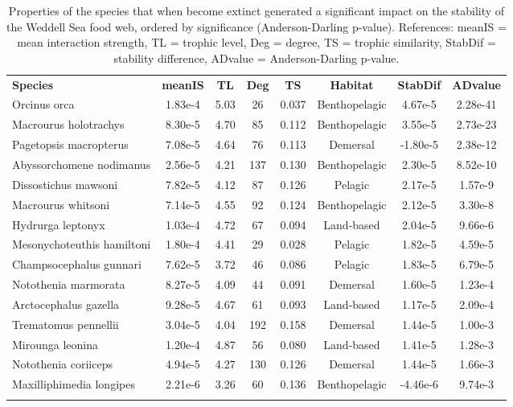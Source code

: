 \documentclass[gc, manuscript]{copernicus}
\begin{document}
\clearpage

\begin{table}[t]
\caption{Properties of the species that when become extinct generated a significant impact on the stability of the Weddell Sea food web, ordered by significance (Anderson-Darling p-value). References: meanIS = mean interaction strength, TL = trophic level, Deg = degree, TS = trophic similarity, StabDif = stability difference, ADvalue = Anderson-Darling p-value.}
\begin{tabular}{l c c c c c c c}
\tophline

\textbf{Species} & \textbf{meanIS} & \textbf{TL} & \textbf{Deg} & \textbf{TS} & \textbf{Habitat} & \textbf{StabDif} & \textbf{ADvalue}\\
\middlehline
Orcinus orca & 1.83e-4 & 5.03 & 26 & 0.037 & Benthopelagic & 4.67e-5 & 2.28e-41 \\
\middlehline
Macrourus holotrachys & 8.30e-5 & 4.70 & 85 & 0.112 & Benthopelagic & 3.55e-5 & 2.73e-23 \\
\middlehline
Pagetopsis macropterus & 7.08e-5 & 4.64 & 76 & 0.113 & Demersal & -1.80e-5 & 2.38e-12 \\
\middlehline
Abyssorchomene nodimanus & 2.56e-5 & 4.21 & 137 & 0.130 & Benthopelagic & 2.30e-5 & 8.52e-10 \\
\middlehline
Dissostichus mawsoni & 7.82e-5 & 4.12 & 87 & 0.126 & Pelagic & 2.17e-5 & 1.57e-9 \\
\middlehline
Macrourus whitsoni & 7.14e-5 & 4.55 & 92 & 0.124 & Benthopelagic & 2.12e-5 & 3.30e-8 \\
\middlehline
Hydrurga leptonyx & 1.03e-4 & 4.72 & 67 & 0.094 & Land-based & 2.04e-5 & 9.66e-6 \\
\middlehline
Mesonychoteuthis hamiltoni & 1.80e-4 & 4.41 & 29 & 0.028 & Pelagic & 1.82e-5 & 4.59e-5 \\
\middlehline
Champsocephalus gunnari & 7.62e-5 & 3.72 & 46 & 0.086 & Pelagic & 1.83e-5 & 6.79e-5 \\
\middlehline
Notothenia marmorata & 8.27e-5 & 4.09 & 44 & 0.091 & Demersal & 1.60e-5 & 1.23e-4 \\
\middlehline
Arctocephalus gazella & 9.28e-5 & 4.67 & 61 & 0.093 & Land-based & 1.17e-5 & 2.09e-4 \\
\middlehline
Trematomus pennellii & 3.04e-5 & 4.04 & 192 & 0.158 & Demersal & 1.44e-5 & 1.00e-3 \\
\middlehline
Mirounga leonina & 1.20e-4 & 4.87 & 56 & 0.080 & Land-based & 1.41e-5 & 1.28e-3 \\
\middlehline
Notothenia coriiceps & 4.94e-5 & 4.27 & 130 & 0.126 & Demersal & 1.44e-5 & 1.66e-3 \\
\middlehline
Maxilliphimedia longipes & 2.21e-6 & 3.26 & 60 & 0.136 & Benthopelagic & -4.46e-6 & 9.74e-3 \\

\bottomhline
\end{tabular}
\end{table}
\end{document}
